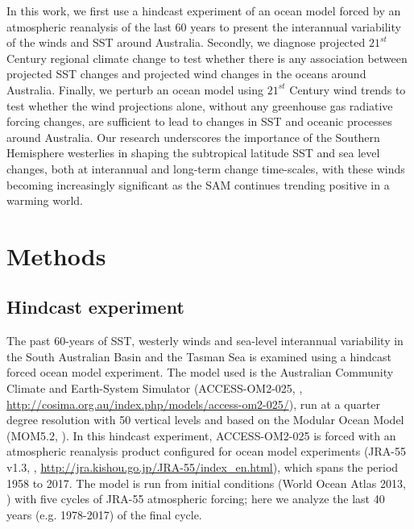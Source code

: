 \documentclass[draft,linenumbers]{agujournal2018}
\begin{document}
In this work, we first use a hindcast experiment of an ocean model forced by an atmospheric reanalysis of the last 60 years to present the interannual variability of the winds and SST around Australia. Secondly, we diagnose projected $21^{st}$ Century regional climate change to test whether there is any association between projected SST changes and projected wind changes in the oceans around Australia. Finally, we perturb an ocean model using $21^{st}$ Century wind trends to test whether the wind projections alone, without any greenhouse gas radiative forcing changes, are sufficient to lead to changes in SST and oceanic processes around Australia. Our research underscores the importance of the Southern Hemisphere westerlies in shaping the subtropical latitude SST and sea level changes, both at interannual and long-term change time-scales, with these winds becoming increasingly significant as the SAM continues trending positive in a warming world.



\section{Methods}
\subsection{Hindcast experiment}
The past 60-years of SST, westerly winds and sea-level interannual variability in the South Australian Basin and the Tasman Sea is examined using a hindcast forced ocean model experiment. The model used is the Australian Community Climate and Earth-System Simulator (ACCESS-OM2-025, \citealp{Bi2012,Kiss2019}, \url{http://cosima.org.au/index.php/models/access-om2-025/}), run at a quarter degree resolution with 50 vertical levels and based on the Modular Ocean Model (MOM5.2, \citealp{Griffies2012}). In this hindcast experiment, ACCESS-OM2-025 is forced with an atmospheric reanalysis product configured for ocean model experiments (JRA-55 v1.3, \citealp{Kobayashi2015}, \url{http://jra.kishou.go.jp/JRA-55/index_en.html}), which spans the period 1958 to 2017. The model is run from initial conditions (World Ocean Atlas 2013, \citealp{Boyer2013}) with five cycles of JRA-55 atmospheric forcing; here we analyze the last 40 years (e.g. 1978-2017) of the final cycle.
\end{document}
